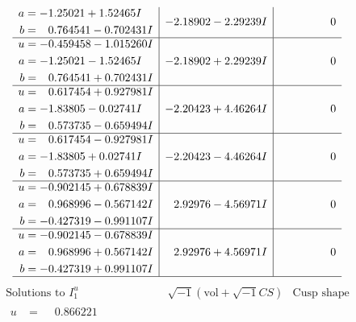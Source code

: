 \documentclass[1p]{elsarticle_modified}
\theoremstyle{definition}
\newcommand{\I}{\sqrt{-1}}
\begin{document}
$$\begin{array}{c|c|c}
\begin{aligned}
a &= -1.25021 + 1.52465 I \\
b &= \phantom{-}0.764541 - 0.702431 I\end{aligned}
 & -2.18902 - 2.29239 I & \phantom{-0.000000 } 0 \\ \hline\begin{aligned}
u &= -0.459458 - 1.015260 I \\
a &= -1.25021 - 1.52465 I \\
b &= \phantom{-}0.764541 + 0.702431 I\end{aligned}
 & -2.18902 + 2.29239 I & \phantom{-0.000000 } 0 \\ \hline\begin{aligned}
u &= \phantom{-}0.617454 + 0.927981 I \\
a &= -1.83805 - 0.02741 I \\
b &= \phantom{-}0.573735 - 0.659494 I\end{aligned}
 & -2.20423 + 4.46264 I & \phantom{-0.000000 } 0 \\ \hline\begin{aligned}
u &= \phantom{-}0.617454 - 0.927981 I \\
a &= -1.83805 + 0.02741 I \\
b &= \phantom{-}0.573735 + 0.659494 I\end{aligned}
 & -2.20423 - 4.46264 I & \phantom{-0.000000 } 0 \\ \hline\begin{aligned}
u &= -0.902145 + 0.678839 I \\
a &= \phantom{-}0.968996 - 0.567142 I \\
b &= -0.427319 - 0.991107 I\end{aligned}
 & \phantom{-}2.92976 - 4.56971 I & \phantom{-0.000000 } 0 \\ \hline\begin{aligned}
u &= -0.902145 - 0.678839 I \\
a &= \phantom{-}0.968996 + 0.567142 I \\
b &= -0.427319 + 0.991107 I\end{aligned}
 & \phantom{-}2.92976 + 4.56971 I & \phantom{-0.000000 } 0\\
 \hline 
 \end{array}$$\newpage$$\begin{array}{c|c|c}  
\text{Solutions to }I^u_{1}& \I (\text{vol} + \sqrt{-1}CS) & \text{Cusp shape}\\
 \hline 
\begin{aligned}
u &= \phantom{-}0.866221\phantom{ +0.000000I} \\

\end{aligned}
\end{array}$$
\end{document}
